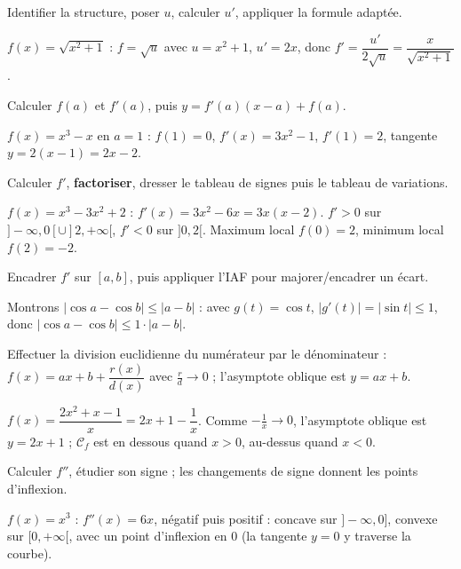 Identifier la structure, poser $u$, calculer $u'$, appliquer la formule adaptée.
\begin{exemple}
$f(x)=\sqrt{x^{2}+1}$ : $f=\sqrt u$ avec $u=x^{2}+1$, $u'=2x$, donc
$f'=\dfrac{u'}{2\sqrt u}=\dfrac{x}{\sqrt{x^{2}+1}}$.
\end{exemple}

Calculer $f(a)$ et $f'(a)$, puis $y=f'(a)(x-a)+f(a)$.
\begin{exemple}
$f(x)=x^{3}-x$ en $a=1$ : $f(1)=0$, $f'(x)=3x^{2}-1$, $f'(1)=2$, tangente $y=2(x-1)=2x-2$.
\end{exemple}

Calculer $f'$, \textbf{factoriser}, dresser le tableau de signes puis le tableau de variations.
\begin{exemple}
$f(x)=x^{3}-3x^{2}+2$ : $f'(x)=3x^{2}-6x=3x(x-2)$. $f'>0$ sur $]-\infty,0[\cup]2,+\infty[$,
$f'<0$ sur $]0,2[$. Maximum local $f(0)=2$, minimum local $f(2)=-2$.
\end{exemple}

Encadrer $f'$ sur $[a,b]$, puis appliquer l'IAF pour majorer/encadrer un écart.
\begin{exemple}
Montrons $|\cos a-\cos b|\le|a-b|$ : avec $g(t)=\cos t$, $|g'(t)|=|\sin t|\le1$, donc
$|\cos a-\cos b|\le 1\cdot|a-b|$.
\end{exemple}

Effectuer la division euclidienne du numérateur par le dénominateur : $f(x)=ax+b+\dfrac{r(x)}{d(x)}$
avec $\frac{r}{d}\to0$ ; l'asymptote oblique est $y=ax+b$.
\begin{exemple}
$f(x)=\dfrac{2x^{2}+x-1}{x}=2x+1-\dfrac1x$. Comme $-\tfrac1x\to0$, l'asymptote oblique
est $y=2x+1$ ; $\mathcal C_f$ est en dessous quand $x>0$, au-dessus quand $x<0$.
\end{exemple}

Calculer $f''$, étudier son signe ; les changements de signe donnent les points d'inflexion.
\begin{exemple}
$f(x)=x^{3}$ : $f''(x)=6x$, négatif puis positif : concave sur $]-\infty,0]$, convexe sur
$[0,+\infty[$, avec un point d'inflexion en $0$ (la tangente $y=0$ y traverse la courbe).
\end{exemple}

